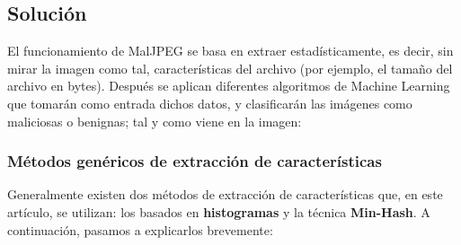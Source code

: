 \subsection{Solución}

El funcionamiento de MalJPEG se basa en extraer estadísticamente, es decir, sin mirar la imagen como tal, características del archivo (por ejemplo, el tamaño del archivo en bytes). Después se aplican diferentes algoritmos de Machine Learning que tomarán como entrada dichos datos, y clasificarán las imágenes como maliciosas o benignas; tal y como viene en la imagen:


\subsubsection{Métodos genéricos de extracción de características}

Generalmente existen dos métodos de extracción de características que, en este artículo, se utilizan: los basados en \textbf{histogramas} y la técnica \textbf{Min-Hash}. A continuación, pasamos a explicarlos brevemente:

